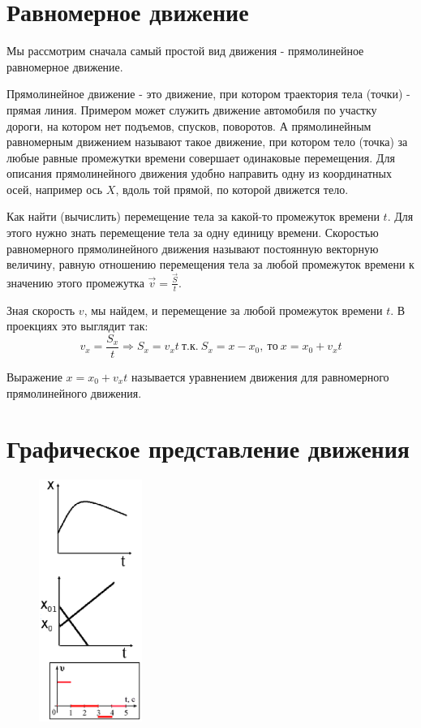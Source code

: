 \documentclass[a6paper, 11pt]{diss_4}
\renewcommand{\'}{\,'}
\begin{document}
\section{Равномерное движение}

  Мы рассмотрим сначала самый простой вид движения - прямолинейное
равномерное движение.

 Прямолинейное движение - это движение, при котором траектория тела (точки) -
прямая линия. Примером может служить движение автомобиля по участку дороги, на
котором нет подъемов, спусков, поворотов. А прямолинейным равномерным движением
называют такое движение, при котором тело (точка) за любые равные промежутки
времени совершает одинаковые перемещения. Для описания прямолинейного движения
удобно направить одну из координатных осей, например ось $X$, вдоль той прямой,
по которой движется тело.

  Как найти (вычислить) перемещение тела за какой-то промежуток времени
$t$. Для этого нужно знать перемещение тела за одну единицу времени. Скоростью
равномерного прямолинейного движения называют постоянную векторную величину,
равную отношению перемещения тела за любой промежуток времени к значению этого
промежутка $\vec{v}=\frac{\vec{S}}{t}$.

  Зная скорость $v$, мы найдем, и перемещение за любой промежуток времени $t$.
В проекциях это выглядит так:
\[
v_x=\frac{S_x}{t}\Rightarrow S_x=v_x t\ т.к.\ S_x=x-x_0,\ то\ x=x_0+v_xt
\]

 Выражение $x=x_0+v_xt$ называется уравнением движения для равномерного
прямолинейного движения.
\newpage
\section{Графическое представление движения}

\begin{figure}
\includegraphics[width=0.3\textwidth]{img/img07.eps}
\caption{}
\label{fig7}
\end{figure}
\end{document}
